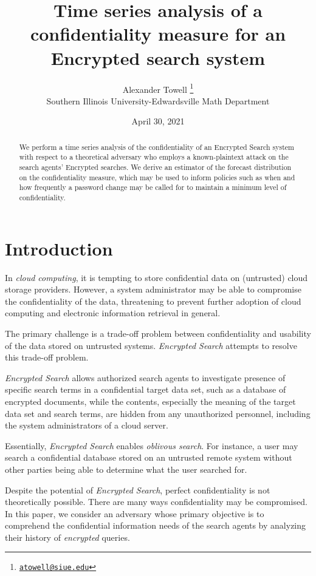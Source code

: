 \documentclass[final,
  11pt,
]{article}
\title{Time series analysis of a confidentiality measure for an Encrypted search system}
\author{Alexander Towell \thanks{\href{mailto:atowell@siue.edu}{\nolinkurl{atowell@siue.edu}}} \\ Southern Illinois University-Edwardsville Math Department}
\date{April 30, 2021}
\begin{document}
\maketitle
\begin{abstract}
We perform a time series analysis of the confidentiality of
an Encrypted Search system with respect to a theoretical adversary
who employs a known-plaintext attack on the search agents' Encrypted searches. 
We derive an estimator of the forecast distribution on the confidentiality
measure, which may be used to inform policies such as when and how
frequently a password change may be called for to maintain a minimum
level of confidentiality.
\end{abstract}

{
\setcounter{tocdepth}{3}
\tableofcontents
}
\hypertarget{introduction}{%
\section{Introduction}\label{introduction}}

In \emph{cloud computing}, it is tempting to store confidential data on
(untrusted) cloud storage providers. However, a system administrator may
be able to compromise the confidentiality of the data, threatening to
prevent further adoption of cloud computing and electronic information
retrieval in general.

The primary challenge is a trade-off problem between confidentiality and
usability of the data stored on untrusted systems.
\emph{Encrypted Search} attempts to resolve this trade-off problem.

\begin{definition}
\emph{Encrypted Search} allows authorized search agents to investigate presence
of specific search terms in a confidential target data set, such as a database
of encrypted documents, while the contents, especially the meaning of the target
data set and search terms, are hidden from any unauthorized personnel, including
the system administrators of a cloud server.
\end{definition}

Essentially, \emph{Encrypted Search} enables \emph{oblivous search}.
For instance, a user may search a confidential database stored on an
untrusted remote system without other parties being able to determine
what the user searched for.

Despite the potential of \emph{Encrypted Search}, perfect
confidentiality is not theoretically possible. There are many ways
confidentiality may be compromised. In this paper, we consider an
adversary whose primary objective is to comprehend the confidential
information needs of the search agents by analyzing their history of
\emph{encrypted} queries.
\end{document}
